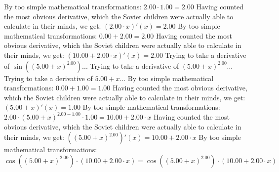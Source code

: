\documentclass{article}
\begin{document}
By too simple mathematical transformations:
 ${{2.00} \cdot {1.00}} = {2.00}$ 
 \newline
 \newline 
Having counted the most obvious derivative, which the Soviet children were actually able to calculate in their minds, we get:
$({{2.00} \cdot {x}})'(x) = {2.00}$\newline
\newline
By too simple mathematical transformations:
 ${{0.00} + {2.00}} = {2.00}$ 
 \newline
 \newline 
Having counted the most obvious derivative, which the Soviet children were actually able to calculate in their minds, we get:
$({{10.00} + {{2.00} \cdot {x}}})'(x) = {2.00}$\newline
\newline
Trying to take a derivative of $ \sin {\left({\left({{5.00} + {x}}\right) ^ {2.00}}\right)} $...\newline
\newline
Trying to take a derivative of ${\left({{5.00} + {x}}\right) ^ {2.00}}$...\newline
\newline
Trying to take a derivative of ${{5.00} + {x}}$...\newline
\newline
By too simple mathematical transformations:
 ${{0.00} + {1.00}} = {1.00}$ 
 \newline
 \newline 
Having counted the most obvious derivative, which the Soviet children were actually able to calculate in their minds, we get:
$({{5.00} + {x}})'(x) = {1.00}$\newline
\newline
By too simple mathematical transformations:
 ${{{2.00} \cdot {\left({{5.00} + {x}}\right) ^ {{2.00} - {1.00}}}} \cdot {1.00}} = {{10.00} + {{2.00} \cdot {x}}}$ 
 \newline
 \newline 
Having counted the most obvious derivative, which the Soviet children were actually able to calculate in their minds, we get:
$({\left({{5.00} + {x}}\right) ^ {2.00}})'(x) = {{10.00} + {{2.00} \cdot {x}}}$\newline
\newline
By too simple mathematical transformations:
 ${ \cos {\left({\left({{5.00} + {x}}\right) ^ {2.00}}\right)}  \cdot \left({{10.00} + {{2.00} \cdot {x}}}\right)} = { \cos {\left({\left({{5.00} + {x}}\right) ^ {2.00}}\right)}  \cdot \left({{10.00} + {{2.00} \cdot {x}}}\right)}$ 
\end{document}
